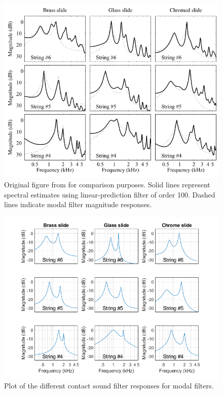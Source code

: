 \documentclass[../main.tex]{subfiles}
\begin{document}
\begin{figure}[h]
        \centering
        \includegraphics[scale=.65]{./images/plots/LongitudinalModeFiltersOriginal.png}
        \caption{Original figure from  for comparison purposes. Solid lines represent spectral estimates using linear-prediction filter of order 100. Dashed lines indicate modal filter magnitude responses.}
        \label{fig:LongModeOrig}
\end{figure}

\begin{figure}[h]
        \centering
        \includegraphics[scale=.65]{./images/plots/LongitudinalModeFiltersRecreation.png}
        \caption{Plot of the different contact sound filter responses for modal filters.}
        \label{fig:LongModeRecr}
\end{figure}
\end{document}
